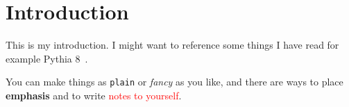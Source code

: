\chapter{Introduction}

This is my introduction. I might want to reference some things I have read for example Pythia 8~\cite{pythia8}.


You can make things as \texttt{plain} or \textit{fancy} as you like, and there are ways to place \textbf{emphasis} and to write \textcolor{red}{notes to yourself}.
